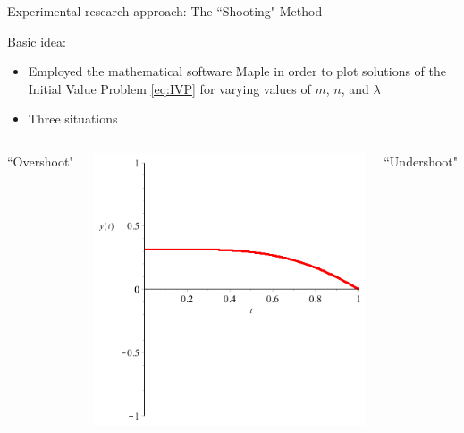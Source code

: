 \documentclass{beamer}
\begin{document}
\begin{frame}{Experimental research approach: The ``Shooting" Method}

\vspace*{-5mm}

Basic idea:

\vspace{2mm}

\begin{itemize}

\item Employed the mathematical software Maple in order to plot solutions of the Initial Value Problem \eqref{eq:IVP} for varying values of $m$, $n$, and $\lambda$ 

\end{itemize}

\begin{itemize}

\item Three situations

\end{itemize}

\begin{columns}


``Overshoot"

\vspace{2mm}

\includegraphics[scale=0.25]{Overshoot.png}


``Undershoot"


\end{columns}
\end{frame}
\end{document}
